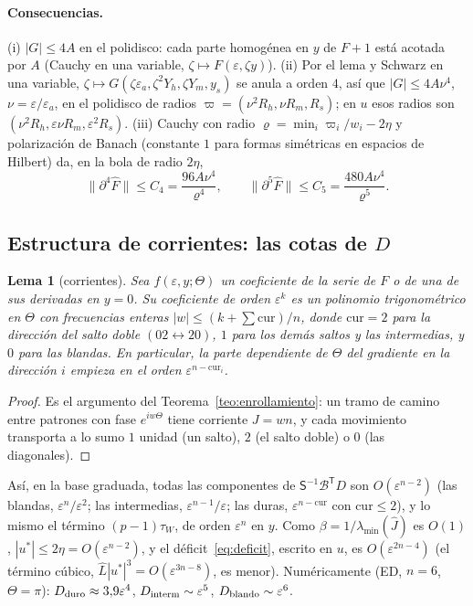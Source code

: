 \documentclass[11pt,a4paper]{article}
\newtheorem{lema}[teorema]{Lema}
\theoremstyle{definition}
\theoremstyle{remark}
\newcommand{\eps}{\varepsilon}
\begin{document}
\paragraph{Consecuencias.} (i) $|G|\le4A$ en el polidisco: cada parte homogénea en $y$ de $F+1$ está
acotada por $A$ (Cauchy en una variable, $\zeta\mapsto F(\eps,\zeta y)$). (ii) Por el lema y Schwarz
en una variable, $\zeta\mapsto G(\zeta\eps_a,\zeta^2Y_h,\zeta Y_m,y_s)$ se anula a orden $4$,
así que $|G|\le4A\nu^4$, $\nu=\eps/\eps_a$, en el polidisco de radios
$\varpi=(\nu^2R_h,\nu R_m,R_s)$; en $u$ esos radios son $(\nu^2R_h,\eps\nu R_m,\eps^2R_s)$.
(iii) Cauchy con radio $\varrho=\min_i\varpi_i/w_i-2\eta$ y polarización de Banach (constante $1$ para formas
simétricas en espacios de Hilbert) da, en la bola de radio $2\eta$,
\[
  \|\partial^4\hat F\|\le C_4=\frac{96A\nu^4}{\varrho^4},\qquad
  \|\partial^5\hat F\|\le C_5=\frac{480A\nu^4}{\varrho^5}.
\]

\subsection{Estructura de corrientes: las cotas de $D$}\label{sec:corrientes}

\begin{lema}[corrientes]\label{lem:corrientes}
Sea $f(\eps,y;\Theta)$ un coeficiente de la serie de $F$ o de una de sus derivadas en $y=0$. Su
coeficiente de orden $\eps^k$ es un polinomio trigonométrico en $\Theta$ con frecuencias enteras
$|w|\le(k+\sum\mathrm{cur})/n$, donde $\mathrm{cur}=2$ para la dirección del salto doble
$(02\leftrightarrow20)$, $1$ para los demás saltos y las intermedias, y $0$ para las blandas. En
particular, la parte dependiente de $\Theta$ del gradiente en la dirección $i$ empieza en el orden
$\eps^{n-\mathrm{cur}_i}$.
\end{lema}

\begin{proof}
Es el argumento del Teorema~\ref{teo:enrollamiento}: un tramo de camino entre patrones con fase
$e^{iw\Theta}$ tiene corriente $J=wn$, y cada movimiento transporta a lo sumo $1$ unidad (un salto), $2$
(el salto doble) o $0$ (las diagonales).
\end{proof}

Así, en la base graduada, todas las componentes de $\mathsf S^{-1}\mathcal B^{\mathsf T}D$ son $O(\eps^{n-2})$ (las
blandas, $\eps^{n}/\eps^2$; las intermedias, $\eps^{n-1}/\eps$; las duras, $\eps^{n-\mathrm{cur}}$ con
$\mathrm{cur}\le2$), y lo mismo el término $(p-1)\tau_W$, de orden $\eps^n$ en $y$. Como $\beta=1/\lambda_{\min}(\hat J)$
es $O(1)$, $|u^*|\le2\eta=O(\eps^{n-2})$, y el déficit~\eqref{eq:deficit}, escrito en $u$, es
$O(\eps^{2n-4})$ (el término cúbico, $\hat L|u^*|^3=O(\eps^{3n-8})$, es menor). Numéricamente (ED, $n=6$, $\Theta=\pi$):
$D_{\rm duro}\approx3{,}9\eps^4$, $D_{\rm interm}\sim\eps^5$, $D_{\rm blando}\sim\eps^6$.
\end{document}
